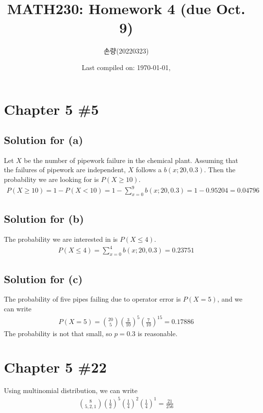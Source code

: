 \documentclass{scrartcl}
\title{MATH230: Homework 4 (due Oct. 9)}
\author{손량(20220323)}
\date{Last compiled on: \today, \currenttime}
\begin{document}
\maketitle

\section{Chapter 5 \#5}
\subsection{Solution for (a)}
Let \(X\) be the number of pipework failure in the chemical plant. Assuming
that the failures of pipework are independent, \(X\) follows a \(b(x; 20,
0.3)\). Then the probability we are looking for is \(P(X \ge 10)\).
\begin{align*}
  P(X \ge 10)
  = 1 - P(X < 10)
  = 1 - \sum^9_{x = 0} b(x; 20, 0.3)
  = 1 - 0.95204
  = 0.04796
\end{align*}

\subsection{Solution for (b)}
The probability we are interested in is \(P(X \le 4)\).
\begin{align*}
  P(X \le 4)
  = \sum^4_{x = 0} b(x; 20, 0.3)
  = 0.23751
\end{align*}

\subsection{Solution for (c)}
The probability of five pipes failing due to operator error is \(P(X = 5)\),
and we can write
\begin{align*}
  P(X = 5)
  = {20 \choose 5} \left( \frac{3}{10} \right)^5
    \left( \frac{7}{10} \right)^{15}
  = 0.17886
\end{align*}
The probability is not that small, so \(p = 0.3\) is reasonable.

\section{Chapter 5 \#22}
Using multinomial distribution, we can write
\begin{align*}
  {8 \choose 5, 2, 1} \left( \frac{1}{2} \right)^5 \left( \frac{1}{4} \right)^2
    \left( \frac{1}{4} \right)^1
  = \frac{21}{256}
\end{align*}
\end{document}
